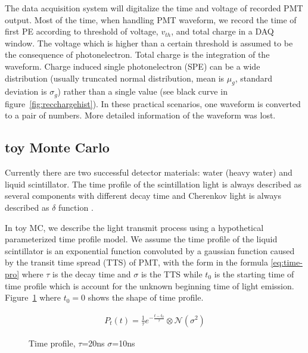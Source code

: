 The data acquisition system will digitalize the time and voltage of recorded PMT output. Most of the time, when handling PMT waveform, we record the time of first PE according to threshold of voltage, $v_{th}$, and total charge in a DAQ window. The voltage which is higher than a certain threshold is assumed to be the consequence of photonelectron. Total charge is the integration of the waveform. Charge induced single photonelectron (SPE) can be a wide distribution (usually truncated normal distribution, mean is $\mu_{g}$, standard deviation is $\sigma_{g}$) rather than a single value (see black curve in figure~\ref{fig:recchargehist}). In these practical scenarios, one waveform is converted to a pair of numbers. More detailed information of the waveform was lost. 

\subsection{toy Monte Carlo}

Currently there are two successful detector materials: water (heavy water) and liquid scintillator. The time profile of the scintillation light is always described as several components with different decay time and Cherenkov light is always described as $\delta$ function \cite{ludhova_particle_2020}. 

In toy MC, we describe the light transmit process using a hypothetical parameterized time profile model. We assume the time profile of the liquid scintillator is an exponential function convoluted by a gaussian function \cite{li_separation_2016} caused by the transit time spread (TTS) of PMT, with the form in the formula \eqref{eq:time-pro} where $\tau$ is the decay time and $\sigma$ is the TTS while $t_{0}$ is the starting time of time profile which is account for the unknown beginning time of light emission. Figure~\ref{fig:time-pro} where $t_{0}=0$ shows the shape of time profile. 

\begin{minipage}{.4\textwidth}
\begin{align}
    P_{t}(t) = \frac{1}{\tau}e^{-\frac{t - t_{0}}{\tau}} \otimes \mathcal{N}(\sigma^{2})
    \label{eq:time-pro}
\end{align}
\end{minipage}
\begin{minipage}{.6\textwidth}
\begin{figure}[H]
    \centering
    \resizebox{\textwidth}{!}{}
    \caption{\label{fig:time-pro} Time profile, $\tau$=20ns $\sigma$=10ns}
\end{figure}
\end{minipage}

